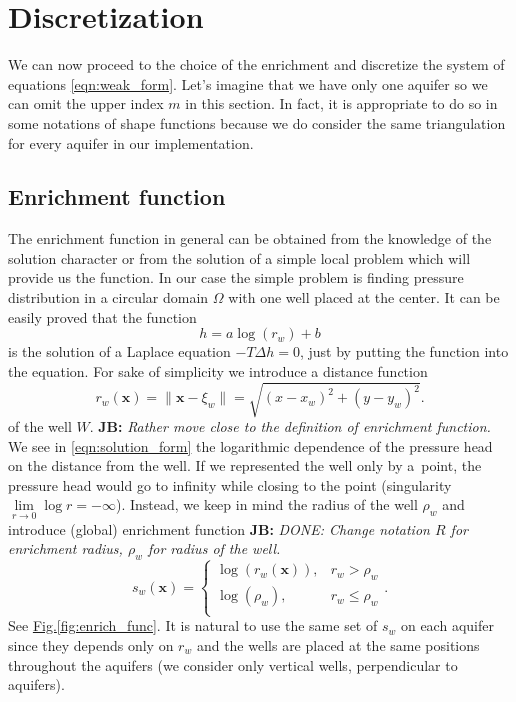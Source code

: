 \documentclass[preprint,12pt]{elsarticle}
\newcommand{\fig}[1]{\hyperref[#1]{Fig.\ref{#1}}}
\def\vc#1{\mathbf{\boldsymbol{#1}}}     %
\newcommand{\bx}{\vc{x}}
\newcommand{\noteJB}[1]{{\color{Blue} \textbf{JB: } \textit{#1}}}
\begin{document}
\section{Discretization}
\label{sec:pum_methods}
We can now proceed to the choice of the enrichment and discretize the system of equations
\eqref{eqn:weak_form}.
Let's imagine that we have only one aquifer so we can omit the upper index $m$ in this section.
In fact, it is appropriate to do so in some notations of shape functions because we do consider the same 
triangulation for every aquifer in our implementation.

\subsection{Enrichment function}
The enrichment function in general can be obtained from the knowledge of the solution character or 
from the solution of a simple local problem which will provide us the function.
In our case the simple problem is finding pressure distribution in a circular domain $\Omega$ with one well 
placed at the center. It can be easily proved that the function
%
\begin{equation} \label{eqn:solution_form}
  h = a \log(r_w)+b
\end{equation}
%
is the solution of a Laplace equation $-T \Delta h = 0$, just by putting the function into the equation. 
For sake of simplicity we introduce a distance function 
\begin{equation*}
      r_w(\bx) = \|\bx - \xi_w\|= \sqrt{(x-x_w)^2+(y-y_w)^2}.
\end{equation*}
of the well $W$.
\noteJB{Rather move close to the definition of enrichment function.}
%
We see in \eqref{eqn:solution_form} the logarithmic dependence of the pressure head on the distance from 
the well. If we represented the well only by a~point, the pressure head would go to infinity while closing 
to the point (singularity $\lim \limits_{r\rightarrow 0} \log r= -\infty$). Instead, we keep in mind the
radius of the well $\rho_w$ and introduce (global) enrichment function
\noteJB{DONE: Change notation $R$ for enrichment radius, $\rho_w$ for radius of the well.}
%
\begin{equation}
\label{eqn:enrich_func}
s_w(\bx) = 
  \begin{cases}
  \log(r_w(\bx)), & r_w > \rho_w\\
  \log(\rho_w), & r_w \le \rho_w\\
  \end{cases}.
\end{equation}
See \fig{fig:enrich_func}.
It is natural to use the same set of $s_w$ on each aquifer since they depends only on $r_w$ and the wells are 
placed at the same positions throughout the aquifers (we consider only vertical wells, perpendicular to aquifers).
%
\end{document}
